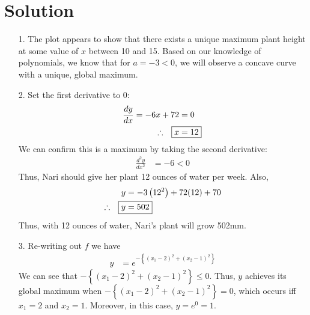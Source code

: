 \documentclass{harvardml}
\theoremstyle{definition}
\theoremstyle{plain}
\newenvironment{solution}
  {\color{blue}\section*{Solution}}
{}
\begin{document}
\newpage


\begin{solution}

\begin{enumerate}
    \item [1.] The plot appears to show that there exists a unique maximum plant height at some value of $x$ between 10 and 15. Based on our knowledge of polynomials, we know that for $a = -3 < 0$, we will observe a concave curve with a unique, global maximum.

    \item[2.] Set the first derivative to 0:
    \begin{align*}
        \frac{dy}{dx} = -6x + 72 &= 0 \\
        \therefore \quad \Aboxed{ x &= 12 }
    \end{align*}
    We can confirm this is a maximum by taking the second derivative:
    \begin{align*}
        \frac{d^2 y}{dx^2} &= -6 < 0
    \end{align*}
    Thus, Nari should give her plant 12 ounces of water per week. Also,
    \begin{align*}
        y &= -3\left(12^2\right) + 72(12) + 70 \\
        \therefore \quad \Aboxed{ y &= 502 }
    \end{align*}
    Thus, with 12 ounces of water, Nari's plant will grow 502mm.

    \item[3.] Re-writing out $f$ we have
    \begin{align*}
        y &= e^{ - \left\{ (x_1-2)^2 + (x_2-1)^2 \right\} }
    \end{align*}
    We can see that $- \left\{ (x_1-2)^2 + (x_2-1)^2 \right\} \leq 0$. Thus, $y$ achieves its global maximum when \newline $- \left\{ (x_1-2)^2 + (x_2-1)^2 \right\} = 0$, which occurs iff $\boxed{x_1 = 2}$ and $\boxed{x_2 = 1}$. Moreover, in this case, $\boxed{ y = e^0 = 1 }$.

\end{enumerate}

\end{solution}

\newpage 
\end{document}
